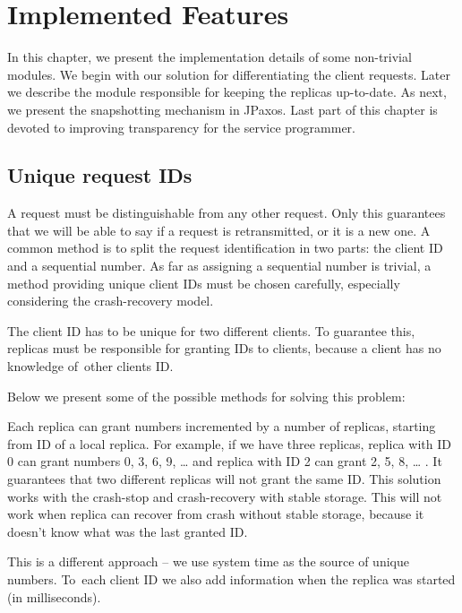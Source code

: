 \chapter{Implemented Features}

In this chapter, we present the implementation details of some non-trivial modules.
We begin with our solution for differentiating the client requests. Later we describe the module responsible for keeping the replicas up-to-date. As next, we present the snapshotting mechanism in JPaxos. Last part of this chapter is devoted to improving transparency for the service programmer.

\section{Unique request IDs}

A request must be distinguishable from any other request. Only this guarantees that we will be able to say if a request is retransmitted, or it is a new one. A common method is to split the request identification in two parts: the client ID and a sequential number. As far as assigning a sequential number is trivial, a method providing unique client IDs must be chosen carefully, especially considering the crash-recovery model.

The client ID has to be unique for two different clients. To guarantee this, replicas must be responsible for granting IDs to clients, because a client has no knowledge of~other clients ID.

Below we present some of the possible methods for solving this problem:

Each replica can grant numbers incremented by a number of replicas, starting from ID of a local replica. For example, if we have three replicas, replica with ID 0 can grant numbers 0, 3, 6, 9, \ldots{} and replica with ID 2 can grant 2, 5, 8, \ldots{} . It guarantees that two different replicas will not grant the same ID. This solution works with the crash-stop and crash-recovery with stable storage. This will not work when replica can recover from crash without stable storage, because it doesn't know what was the last granted ID.

\clearpage

This is a different approach -- we use system time as the source of unique numbers. To~each client ID we also add information when the replica was started (in milliseconds).

